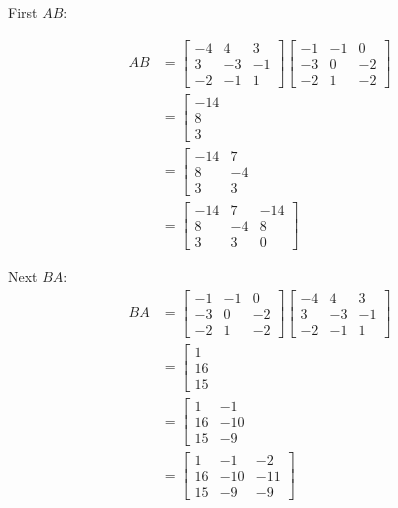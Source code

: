 \begin{solution}
    First $AB$:

    \[
    \begin{aligned}
    A B &=\left[\begin{array}{rrr}
    -4 & 4 & 3 \\
    3 & -3 & -1 \\
    -2 & -1 & 1
    \end{array}\right]\left[\begin{array}{rrr}
    -1 & -1 & 0 \\
    -3 & 0 & -2 \\
    -2 & 1 & -2
    \end{array}\right] \\
    & =\left[\begin{array}{c}
    -14 \\
    8 \\
    3
    \end{array}\right. \\
    & =\left[\begin{array}{rr}
    -14 & 7 \\
    8 & -4 \\
    3 & 3
    \end{array}\right. \\
    & =\left[\begin{array}{rrr}
    -14 & 7 & -14 \\
    8 & -4 & 8 \\
    3 & 3 & 0
    \end{array}\right]
    \end{aligned}
    \]

    Next $BA$:
    \[
    \begin{aligned}
    B A & =\left[\begin{array}{rrr}
    -1 & -1 & 0 \\
    -3 & 0 & -2 \\
    -2 & 1 & -2
    \end{array}\right]\left[\begin{array}{rrr}
    -4 & 4 & 3 \\
    3 & -3 & -1 \\
    -2 & -1 & 1
    \end{array}\right] \\
    & =\left[\begin{array}{rrr}
    1 \\
    16 & \\
    15
    \end{array}\right. \\
    & =\left[\begin{array}{rrr}
    1 & -1 \\
    16 & -10 \\
    15 & -9
    \end{array}\right. \\
    & =\left[\begin{array}{rrr}
    1 & -1 & -2 \\
    16 & -10 & -11 \\
    15 & -9 & -9
    \end{array}\right]
    \end{aligned}
    \]


\end{solution}
